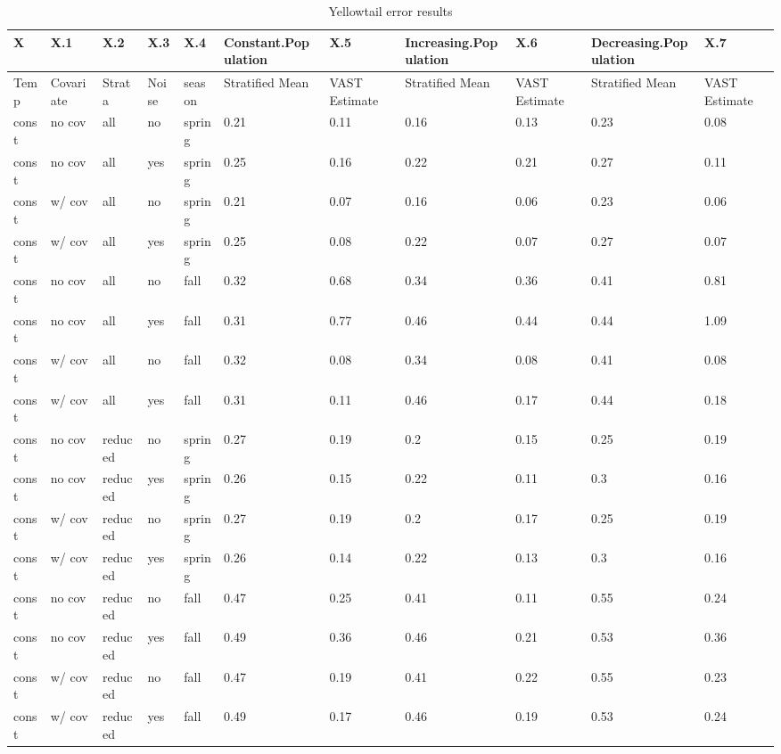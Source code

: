 \documentclass[
]{article}
\begin{document}
\begin{table}

\caption{\label{tab:unnamed-chunk-1}Yellowtail error results}
\centering
\begin{tabular}[t]{l|l|l|l|l|l|l|l|l|l|l}
\hline
X & X.1 & X.2 & X.3 & X.4 & Constant.Population & X.5 & Increasing.Population & X.6 & Decreasing.Population & X.7\\
\hline
Temp & Covariate & Strata & Noise & season & Stratified Mean & VAST Estimate & Stratified Mean & VAST Estimate & Stratified Mean & VAST Estimate\\
\hline
const & no cov & all & no & spring & 0.21 & 0.11 & 0.16 & 0.13 & 0.23 & 0.08\\
\hline
const & no cov & all & yes & spring & 0.25 & 0.16 & 0.22 & 0.21 & 0.27 & 0.11\\
\hline
const & w/ cov & all & no & spring & 0.21 & 0.07 & 0.16 & 0.06 & 0.23 & 0.06\\
\hline
const & w/ cov & all & yes & spring & 0.25 & 0.08 & 0.22 & 0.07 & 0.27 & 0.07\\
\hline
const & no cov & all & no & fall & 0.32 & 0.68 & 0.34 & 0.36 & 0.41 & 0.81\\
\hline
const & no cov & all & yes & fall & 0.31 & 0.77 & 0.46 & 0.44 & 0.44 & 1.09\\
\hline
const & w/ cov & all & no & fall & 0.32 & 0.08 & 0.34 & 0.08 & 0.41 & 0.08\\
\hline
const & w/ cov & all & yes & fall & 0.31 & 0.11 & 0.46 & 0.17 & 0.44 & 0.18\\
\hline
const & no cov & reduced & no & spring & 0.27 & 0.19 & 0.2 & 0.15 & 0.25 & 0.19\\
\hline
const & no cov & reduced & yes & spring & 0.26 & 0.15 & 0.22 & 0.11 & 0.3 & 0.16\\
\hline
const & w/ cov & reduced & no & spring & 0.27 & 0.19 & 0.2 & 0.17 & 0.25 & 0.19\\
\hline
const & w/ cov & reduced & yes & spring & 0.26 & 0.14 & 0.22 & 0.13 & 0.3 & 0.16\\
\hline
const & no cov & reduced & no & fall & 0.47 & 0.25 & 0.41 & 0.11 & 0.55 & 0.24\\
\hline
const & no cov & reduced & yes & fall & 0.49 & 0.36 & 0.46 & 0.21 & 0.53 & 0.36\\
\hline
const & w/ cov & reduced & no & fall & 0.47 & 0.19 & 0.41 & 0.22 & 0.55 & 0.23\\
\hline
const & w/ cov & reduced & yes & fall & 0.49 & 0.17 & 0.46 & 0.19 & 0.53 & 0.24\\

\end{tabular}
\end{table}
\end{document}
